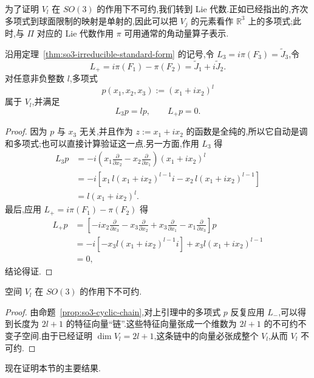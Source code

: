 为了证明 $V_l$ 在 $SO(3)$ 的作用下不可约,我们转到 Lie 代数.正如已经指出的,齐次多项式到球面限制的映射是单射的,因此可以把 $V_j$ 的元素看作 $\mathbb R^3$ 上的多项式;此时,与 $\Pi$ 对应的 Lie 代数作用 $\pi$ 可用通常的角动量算子表示.

\begin{lemma}[球谐空间中的最高权向量]\label{lem:spherical-harmonics-highest-weight}
沿用定理~\ref{thm:so3-irreducible-standard-form} 的记号,令 $L_3=i\pi(F_3)=\widetilde J_3$,令
\[
 L_+=i\pi(F_1)-\pi(F_2)=\widetilde J_1+i\widetilde J_2.
\]
对任意非负整数 $l$,多项式
\[
 p(x_1,x_2,x_3):=(x_1+ix_2)^l
\]
属于 $V_l$,并满足
\[
 L_3p=lp,\qquad L_+p=0.
\]
\end{lemma}

\begin{proof}
因为 $p$ 与 $x_3$ 无关,并且作为 $z:=x_1+ix_2$ 的函数是全纯的,所以它自动是调和多项式;也可以直接计算验证这一点.另一方面,作用 $L_3$ 得
\[
\begin{aligned}
L_3p
&=-i\left(x_1\frac{\partial}{\partial x_2}-x_2\frac{\partial}{\partial x_1}\right)(x_1+ix_2)^l\\
&=-i\left[x_1\,l(x_1+ix_2)^{l-1}i-x_2\,l(x_1+ix_2)^{l-1}\right]\\
&=l(x_1+ix_2)^l.
\end{aligned}
\]
最后,应用 $L_+=i\pi(F_1)-\pi(F_2)$ 得
\[
\begin{aligned}
L_+p
&=\left[-ix_2\frac{\partial}{\partial x_3}-x_3\frac{\partial}{\partial x_2}
 +x_3\frac{\partial}{\partial x_1}-x_1\frac{\partial}{\partial x_3}\right]p\\
&=-i[-x_3l(x_1+ix_2)^{l-1}i]+x_3l(x_1+ix_2)^{l-1}\\
&=0,
\end{aligned}
\]
结论得证.
\end{proof}

\begin{corollary}[$V_l$ 的不可约性]\label{cor:spherical-harmonics-irreducible}
空间 $V_l$ 在 $SO(3)$ 的作用下不可约.
\end{corollary}

\begin{proof}
由命题~\ref{prop:so3-cyclic-chain},对上引理中的多项式 $p$ 反复应用 $L_-$,可以得到长度为 $2l+1$ 的特征向量“链”.这些特征向量张成一个维数为 $2l+1$ 的不可约不变子空间.由于已经证明 $\dim V_l=2l+1$,这条链中的向量必张成整个 $V_l$,从而 $V_l$ 不可约.
\end{proof}

现在证明本节的主要结果.

